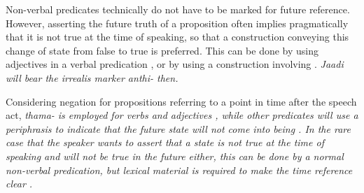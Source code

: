 Non-verbal predicates technically do not have to be marked for future reference. However, asserting the future truth of a proposition often implies pragmatically that it is not true at the time of speaking, so that a construction conveying this change of state from false to true is preferred. This can be done by using adjectives in a verbal predication , or by using a construction involving   . \em Jaadi \em will bear the irrealis marker \em anthi- \em then.




Considering negation for propositions referring to a point in time after the speech act, \em thama- \em is employed for verbs  and adjectives , while other predicates will use a periphrasis to indicate that the future state will not come into being . In the rare case that the speaker wants to assert that a state is not true at the time of speaking and will not be true in the future either, this can be done by a normal non-verbal predication, but lexical material is required to make the time reference clear .




